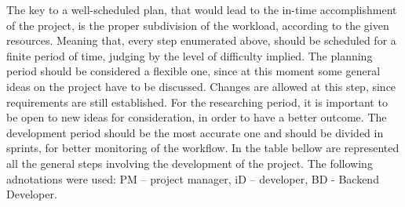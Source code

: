 \documentclass[12pt,a4paper,titlepage]{article}
\begin{document}
The key to a well-scheduled plan, that would lead to the in-time accomplishment of the project, is the proper subdivision of the workload, according to the given resources. Meaning that, every step enumerated above, should be scheduled for a finite period of time, judging by the level of difficulty implied. The planning period should be considered a flexible one, since at this moment some general ideas on the project have to be discussed. Changes are allowed at this step, since requirements are still established. For the researching period, it is important to be open to new ideas for consideration, in order to have a better outcome. The development period should be the most accurate one and should be divided in sprints, for better monitoring of the workflow. In the table bellow are represented all the general steps involving the development of the project. The following adnotations were used: PM – project manager, iD – developer, BD - Backend Developer.


\begin{table}[H]
\centering
\caption{Time schedule}
\label{table:schedule}
\end{table}
 
\end{document}
